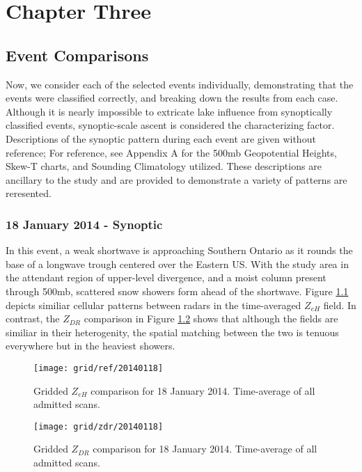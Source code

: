

\chapter{Chapter Three}

\section{Event Comparisons}
Now, we consider each of the selected events individually, demonstrating that the events were
classified correctly, and breaking down the results from each case. Although it is nearly impossible to
extricate lake influence from synoptically classified events, synoptic-scale ascent is considered the
characterizing factor. Descriptions of the synoptic pattern during each event are given without
reference; For reference, see Appendix A for the 500mb Geopotential Heights, Skew-T charts, and
Sounding Climatology utilized. These descriptions are ancillary to the study and are provided to
demonstrate a variety of patterns are reresented.

\subsection{18 January 2014 - Synoptic}
In this event, a weak shortwave is approaching Southern Ontario as it rounds the base of a longwave
trough centered over the Eastern US. With the study area in the attendant
region of upper-level divergence, and a moist column present through 500mb, 
scattered snow showers form ahead of the shortwave. Figure \ref{fig:grid_ref_20140118} depicts
similiar cellular patterns between radars in the time-averaged $Z_{eH}$ field. In contrast, the $Z_{DR}$
comparison in Figure \ref{fig:grid_zdr_20140118}
shows that although the fields are similiar in their heterogenity, the spatial matching between the two is
tenuous everywhere but in the heaviest showers.

\begin{figure}[H]
\texttt{[image: grid/ref/20140118]}
\caption{Gridded $Z_{eH}$ comparison for 18 January 2014. Time-average of all admitted scans.} 
\label{fig:grid_ref_20140118}
\end{figure}

\begin{figure}[H]
\texttt{[image: grid/zdr/20140118]}
\caption{Gridded $Z_{DR}$ comparison for 18 January 2014. Time-average of all admitted scans.} 
\label{fig:grid_zdr_20140118}
\end{figure}
\vspace{5mm}

